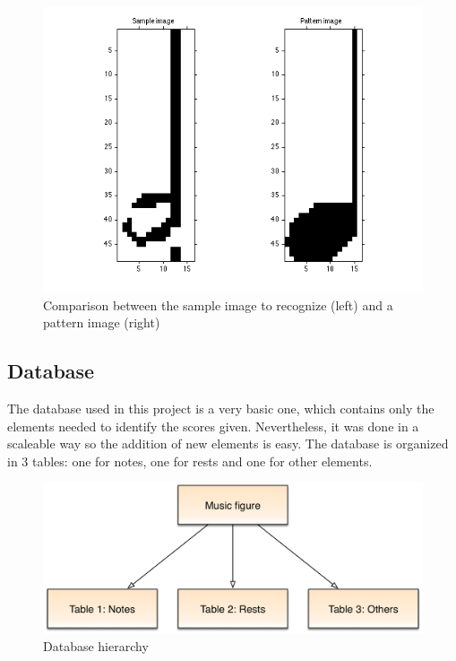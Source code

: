 \documentclass[10pt, a4paper]{article}
\begin{document}
\begin{figure}[h!]
  \centering
    \includegraphics[scale=0.15]{./img/img4.png}
  \caption{Comparison between the sample image to recognize (left) and a pattern image (right)}
  \label{fig4}
\end{figure}

\subsection*{Database}

The database used in this project is a very basic one, which contains only the elements needed to identify the scores given. Nevertheless, it was done in a scaleable way so the addition of new elements is easy. The database is organized in 3 tables: one for notes, one for rests and one for other elements. 

\begin{figure}[h!]
  \centering
    \includegraphics[scale=0.4]{./img/BD.png}
  \caption{Database hierarchy}
  \label{figBD}
\end{figure}
\end{document}

